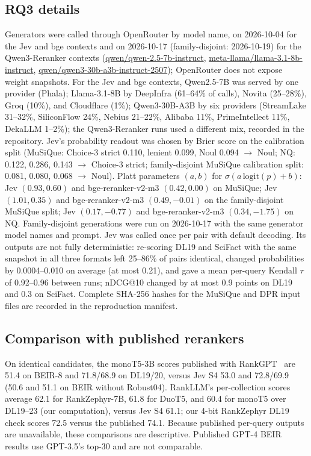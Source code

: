 \subsection{RQ3 details}\label{app:extra}
Generators were called through OpenRouter by model name, on 2026-10-04 for the Jev and bge contexts and on 2026-10-17 (family-disjoint: 2026-10-19) for the Qwen3-Reranker contexts (\url{qwen/qwen-2.5-7b-instruct}, \url{meta-llama/llama-3.1-8b-instruct}, \url{qwen/qwen3-30b-a3b-instruct-2507}); OpenRouter does not expose weight snapshots. For the Jev and bge contexts, Qwen2.5-7B was served by one provider (Phala); Llama-3.1-8B by DeepInfra (61--64\% of calls), Novita (25--28\%), Groq (10\%), and Cloudflare (1\%); Qwen3-30B-A3B by six providers (StreamLake 31--32\%, SiliconFlow 24\%, Nebius 21--22\%, Alibaba 11\%, PrimeIntellect 11\%, DekaLLM 1--2\%); the Qwen3-Reranker runs used a different mix, recorded in the repository.
Jev's probability readout was chosen by Brier score on the calibration split (MuSiQue: Choice-3 strict 0.110, lenient 0.099, Noul 0.094 $\rightarrow$ Noul; NQ: 0.122, 0.286, 0.143 $\rightarrow$ Choice-3 strict; family-disjoint MuSiQue calibration split: 0.081, 0.080, 0.068 $\rightarrow$ Noul). Platt parameters $(a,b)$ for $\sigma(a\,\mathrm{logit}(p)+b)$: Jev $(0.93, 0.60)$ and bge-reranker-v2-m3 $(0.42, 0.00)$ on MuSiQue; Jev $(1.01, 0.35)$ and bge-reranker-v2-m3 $(0.49, -0.01)$ on the family-disjoint MuSiQue split; Jev $(0.17, -0.77)$ and bge-reranker-v2-m3 $(0.34, -1.75)$ on NQ. Family-disjoint generations were run on 2026-10-17 with the same generator model names and prompt. Jev was called once per pair with default decoding. Its outputs are not fully deterministic: re-scoring DL19 and SciFact with the same snapshot in all three formats left 25--86\% of pairs identical, changed probabilities by 0.0004--0.010 on average (at most 0.21), and gave a mean per-query Kendall $\tau$ of 0.92--0.96 between runs; nDCG@10 changed by at most 0.9 points on DL19 and 0.3 on SciFact. Complete SHA-256 hashes for the MuSiQue and DPR input files are recorded in the reproduction manifest.

\subsection{Comparison with published rerankers}

On identical candidates, the monoT5-3B scores published with RankGPT~\cite{sun2023rankgpt} are 51.4 on BEIR-8 and 71.8/68.9 on DL19/20, versus Jev S4 53.0 and 72.8/69.9 (50.6 and 51.1 on BEIR without Robust04). RankLLM's per-collection scores~\cite{rankllm} average 62.1 for RankZephyr-7B, 61.8 for DuoT5, and 60.4 for monoT5 over DL19--23 (our computation), versus Jev S4 61.1; our 4-bit RankZephyr DL19 check scores 72.5 versus the published 74.1. Because published per-query outputs are unavailable, these comparisons are descriptive. Published GPT-4 BEIR results use GPT-3.5's top-30 and are not comparable.

